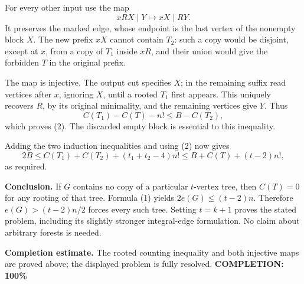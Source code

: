 For every other input use the map
\[
 xRX\mid Y\longmapsto xX\mid RY.
\]
It preserves the marked edge, whose endpoint is the last vertex of the nonempty block $X$. The new prefix $xX$ cannot contain $T_2$: such a copy would be disjoint, except at $x$, from a copy of $T_1$ inside $xR$, and their union would give the forbidden $T$ in the original prefix.

The map is injective. The output cut specifies $X$; in the remaining suffix read vertices after $x$, ignoring $X$, until a rooted $T_1$ first appears. This uniquely recovers $R$, by its original minimality, and the remaining vertices give $Y$. Thus
\[
 C(T_1)-C(T)-n!\leq B-C(T_2),
\]
which proves (2). The discarded empty block is essential to this inequality.

Adding the two induction inequalities and using (2) now gives
\[
 2B\leq C(T_1)+C(T_2)+(t_1+t_2-4)n!
 \leq B+C(T)+(t-2)n!,
\]
as required.

\textbf{Conclusion.}
If $G$ contains no copy of a particular $t$-vertex tree, then $C(T)=0$ for any rooting of that tree. Formula (1) yields $2e(G)\leq(t-2)n$. Therefore $e(G)>(t-2)n/2$ forces every such tree. Setting $t=k+1$ proves the stated problem, including its slightly stronger integral-edge formulation. No claim about arbitrary forests is needed.

\textbf{Completion estimate.}
The rooted counting inequality and both injective maps are proved above; the displayed problem is fully resolved.
\textbf{COMPLETION: 100\%}
